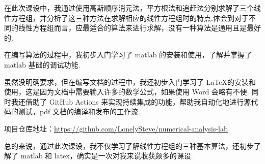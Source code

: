 在此次课设中，我通过使用高斯顺序消元法，平方根法和追赶法分别求解了三个线性方程组，并分析了这三种方法在求解相应的线性方程组时的特点.体会到对于不同的线性方程组而言，应最适合的算法来进行求解，没有一种算法是通用且是最好的.

在编写算法的过程中，我初步入门学习了 matlab 的安装和使用，了解并掌握了 matlab 基础的调试功能.

虽然没明确要求，但在编写文档的过程中，我还初步入门学习了 \LaTeX 的安装和使用，这是因为文档中需要输入许多的数学公式，如果使用 Word 会略有不便.
同时我还借助了 GitHub Actions 来实现持续集成的功能，帮助我自动化地进行源代码的测试，pdf 文档的编译和发布的工作流.

项目仓库地址：\href{https://github.com/LonelySteve/numerical-analysis-lab}{https://github.com/LonelySteve/numerical-analysis-lab}

总的来说，通过此次课设，我不仅学习了解线性方程组的三种基本算法，还初步了解了 matlab 和 latex，确实是一次对我来说收获颇多的课设.
